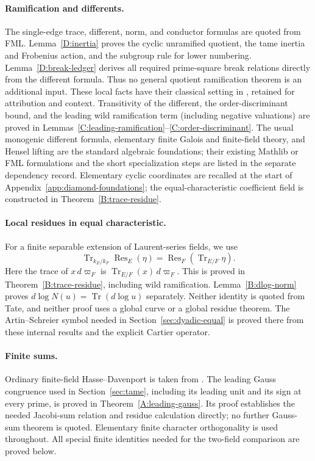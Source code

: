 \documentclass[11pt]{amsart}
\theoremstyle{definition}
\theoremstyle{remark}
\newcommand{\Tr}{\operatorname{Tr}}
\newcommand{\Res}{\operatorname{Res}}
\begin{document}
\paragraph{Ramification and differents.}
The single-edge trace, different, norm, and conductor formulas are
quoted from FML. Lemma~\ref{D:inertia} proves the cyclic unramified
quotient, the tame inertia and Frobenius action, and the subgroup rule
for lower numbering. Lemma~\ref{D:break-ledger} derives all required
prime-square break relations directly from the different formula.
Thus no general quotient ramification theorem is an additional input.
These local facts have their classical setting in
\cite[Chapters~III--V]{Serre}, retained for attribution and context.
Transitivity of the different, the order-discriminant bound, and the
leading wild ramification term (including negative valuations) are
proved in Lemmas~\ref{C:leading-ramification}--\ref{C:order-discriminant}.
The usual monogenic different formula, elementary finite Galois and
finite-field theory, and Hensel lifting are the standard algebraic
foundations; their existing Mathlib or FML formulations and the short
specialization steps are listed in the separate dependency record.
Elementary cyclic coordinates are recalled at the start of
Appendix~\ref{app:diamond-foundations}; the equal-characteristic
coefficient field is constructed in Theorem~\ref{B:trace-residue}.

\paragraph{Local residues in equal characteristic.}
For a finite separable extension of Laurent-series fields, we use
\begin{equation}\label{U:residue-input}
 \Tr_{k_E/k_F}\Res_E(\eta)=\Res_F(\Tr_{E/F}\eta).
\end{equation}
Here the trace of $x\,d\varpi_F$ is $\Tr_{E/F}(x)\,d\varpi_F$.
This is proved in Theorem~\ref{B:trace-residue}, including wild
ramification. Lemma~\ref{B:dlog-norm} proves
$d\log N(u)=\Tr(d\log u)$ separately. Neither identity is quoted from
Tate, and neither proof uses a global curve or a global residue theorem.
The Artin--Schreier symbol needed in Section~\ref{sec:dyadic-equal} is
proved there from these internal results and the explicit Cartier
operator.

\paragraph{Finite sums.}
Ordinary finite-field Hasse--Davenport is taken from \cite{Ueda}.
The leading Gauss congruence used in Section~\ref{sec:tame}, including
its leading unit and its sign at every prime, is proved in
Theorem~\ref{A:leading-gauss}. Its proof establishes the needed
Jacobi-sum relation and residue calculation directly; no further
Gauss-sum theorem is quoted. Elementary finite character orthogonality
is used throughout. All special finite identities needed for the
two-field comparison are proved below.
\end{document}
